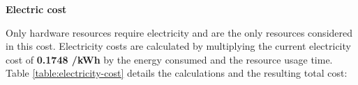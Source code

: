 
\textbf{Electric cost}
\label{sec:electric-cost}
\vspace{-5pt}

Only hardware resources require electricity and are the only resources considered in this cost. Electricity costs are calculated by multiplying the current electricity cost of \textbf{0.1748 \texteuro /kWh} \cite{electricity-price-spain} by the energy consumed and the resource usage time. Table \ref{table:electricity-cost} details the calculations and the resulting total cost: 

\vspace{-5pt}

\begin{table}[H]
    \renewcommand{\arraystretch}{1}
    \centering
    \footnotesize
    \setlength{\tabcolsep}{3.5pt} 
    \normalsize 
    \caption[ Electricity cost of the project's hardware resources ]
    {Electricity cost of the project's hardware resources. [Own creation]} 
    \vspace{-1em}
    \label{table:electricity-cost}
\end{table}

\vspace{-10pt}
